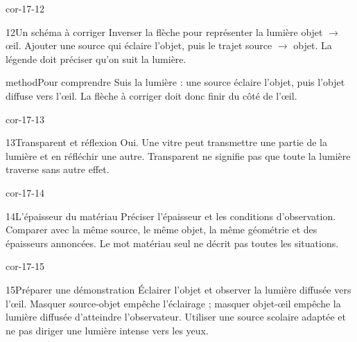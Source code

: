 \documentclass[12pt,twoside,openany]{book}
\begin{document}
\begin{blocLivre}{cor-17-12}
\begin{corrige}{12}{Un schéma à corriger}
Inverser la flèche pour représenter la lumière objet \(\rightarrow\) œil. Ajouter une source qui éclaire l’objet, puis le trajet source \(\rightarrow\) objet. La légende doit préciser qu’on suit la lumière.\par
\begin{pcEncadre}{method}{Pour comprendre}
Suis la lumière : une source éclaire l’objet, puis l’objet diffuse vers l’œil. La flèche à corriger doit donc finir du côté de l’œil.\par
\end{pcEncadre}
\end{corrige}\end{blocLivre}
\begin{blocLivre}{cor-17-13}
\begin{corrige}{13}{Transparent et réflexion}
Oui. Une vitre peut transmettre une partie de la lumière et en réfléchir une autre. Transparent ne signifie pas que toute la lumière traverse sans autre effet.\par
\end{corrige}\end{blocLivre}
\begin{blocLivre}{cor-17-14}
\begin{corrige}{14}{L’épaisseur du matériau}
Préciser l’épaisseur et les conditions d’observation. Comparer avec la même source, le même objet, la même géométrie et des épaisseurs annoncées. Le mot matériau seul ne décrit pas toutes les situations.\par
\end{corrige}\end{blocLivre}
\begin{blocLivre}{cor-17-15}
\begin{corrige}{15}{Préparer une démonstration}
Éclairer l’objet et observer la lumière diffusée vers l’œil. Masquer source-objet empêche l’éclairage ; masquer objet-œil empêche la lumière diffusée d’atteindre l’observateur. Utiliser une source scolaire adaptée et ne pas diriger une lumière intense vers les yeux.\par
{}
\end{corrige}\end{blocLivre}
\end{document}
